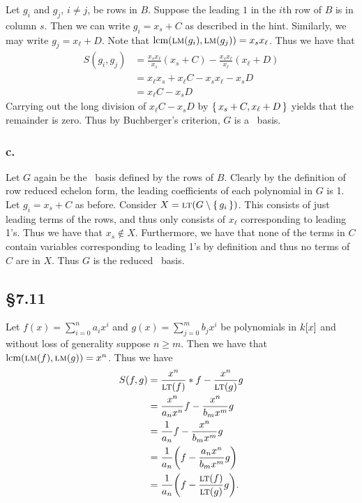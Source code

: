 \documentclass[letterpaper]{article}
\begin{document}
Let $g_{i}$ and $g_{j}$, $i \neq j$, be rows in $B$. Suppose the leading $1$ in the $i$th row of $B$ is in column $s$. Then we can write $g_{i} = x_{s} + C$ as described in the hint. Similarly, we may write $g_{j} = x_{\ell} + D$. Note that $\operatorname{lcm}(\operatorname{\textsc{lm}}(g_{i}), \operatorname{\textsc{lm}}(g_{j})) = x_{s}x_{\ell}$. Thus we have that
\begin{align*}
  S(g_{i}, g_{j}) &= \frac{x_{s} x_{\ell}}{x_{s}}(x_{s} + C) - \frac{x_{s} x_{\ell}}{x_{\ell}} (x_{\ell} + D) \\
                  &= x_{\ell}x_{s} + x_{\ell} C - x_{s} x_{\ell} - x_{s} D \\
                  &= x_{\ell} C - x_{s} D
\end{align*}
Carrying out the long division of $x_{\ell} C - x_{s} D$ by $\set{x_{s} + C, x_{\ell} + D}$ yields that the remainder is zero. Thus by Buchberger's criterion, $G$ is a \Grobner\ basis.

\subsubsection{c.}

Let $G$ again be the \Grobner\ basis defined by the rows of $B$. Clearly by the definition of row reduced echelon form, the leading coefficients of each polynomial in $G$ is 1. Let $g_{i} = x_{s} + C$ as before. Consider $X = \gen{\lt(G \setminus \set{g_{i}})}$. This consists of just leading terms of the rows, and thus only consists of $x_{\ell}$ corresponding to leading 1's. Thus we have that $x_{s} \notin X$. Furthermore, we have that none of the terms in $C$ contain variables corresponding to leading 1's by definition and thus no terms of $C$ are in $X$. Thus $G$ is the reduced \Grobner\ basis.

\subsection{\S 7.11}

Let $f(x) = \sum_{i = 0}^{n} a_{i}x^{i}$ and $g(x) = \sum_{j = 0}^{m} b_{j} x^{i}$ be polynomials in $k\bqty{x}$ and without loss of generality suppose $n \geq m$. Then we have that $\operatorname{lcm}(\operatorname{\textsc{lm}}(f), \operatorname{\textsc{lm}}(g)) = x^{n}$. Thus we have
\begin{align*}
  S(f, g) &= \frac{x^{n}}{\lt(f)} * f - \frac{x^{n}}{\lt(g)}g \\
          &= \frac{x^{n}}{a_{n}x^{n}} f - \frac{x^{n}}{b_{m}x^{m}}g \\
          &= \frac{1}{a_{n}}f - \frac{x^{n}}{b_{m}x^{m}}g \\
          &= \frac{1}{a_{n}}\pqty{f - \frac{a_{n}x^{n}}{b_{m}x^{m}}g} \\
          &= \frac{1}{a_{n}}\pqty{f - \frac{\lt(f)}{\lt(g)}g}.
\end{align*}
\end{document}

